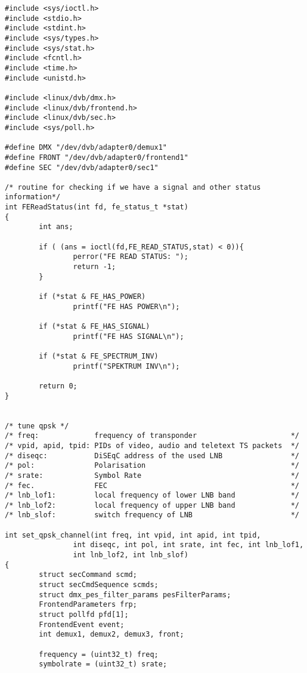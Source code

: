 {\small
\begin{verbatim}
#include <sys/ioctl.h>
#include <stdio.h>
#include <stdint.h>
#include <sys/types.h>
#include <sys/stat.h>
#include <fcntl.h>
#include <time.h>
#include <unistd.h>

#include <linux/dvb/dmx.h>
#include <linux/dvb/frontend.h>
#include <linux/dvb/sec.h>
#include <sys/poll.h>

#define DMX "/dev/dvb/adapter0/demux1"
#define FRONT "/dev/dvb/adapter0/frontend1"
#define SEC "/dev/dvb/adapter0/sec1"

/* routine for checking if we have a signal and other status information*/
int FEReadStatus(int fd, fe_status_t *stat)
{
        int ans;

        if ( (ans = ioctl(fd,FE_READ_STATUS,stat) < 0)){
                perror("FE READ STATUS: ");
                return -1;
        }

        if (*stat & FE_HAS_POWER)
                printf("FE HAS POWER\n");

        if (*stat & FE_HAS_SIGNAL)
                printf("FE HAS SIGNAL\n");

        if (*stat & FE_SPECTRUM_INV)
                printf("SPEKTRUM INV\n");

        return 0;
}


/* tune qpsk */
/* freq:             frequency of transponder                      */
/* vpid, apid, tpid: PIDs of video, audio and teletext TS packets  */
/* diseqc:           DiSEqC address of the used LNB                */
/* pol:              Polarisation                                  */
/* srate:            Symbol Rate                                   */
/* fec.              FEC                                           */
/* lnb_lof1:         local frequency of lower LNB band             */
/* lnb_lof2:         local frequency of upper LNB band             */
/* lnb_slof:         switch frequency of LNB                       */

int set_qpsk_channel(int freq, int vpid, int apid, int tpid,
                int diseqc, int pol, int srate, int fec, int lnb_lof1, 
                int lnb_lof2, int lnb_slof)
{
        struct secCommand scmd;
        struct secCmdSequence scmds;
        struct dmx_pes_filter_params pesFilterParams; 
        FrontendParameters frp;
        struct pollfd pfd[1];
        FrontendEvent event;
        int demux1, demux2, demux3, front;

        frequency = (uint32_t) freq;
        symbolrate = (uint32_t) srate;


\end{verbatim}}
